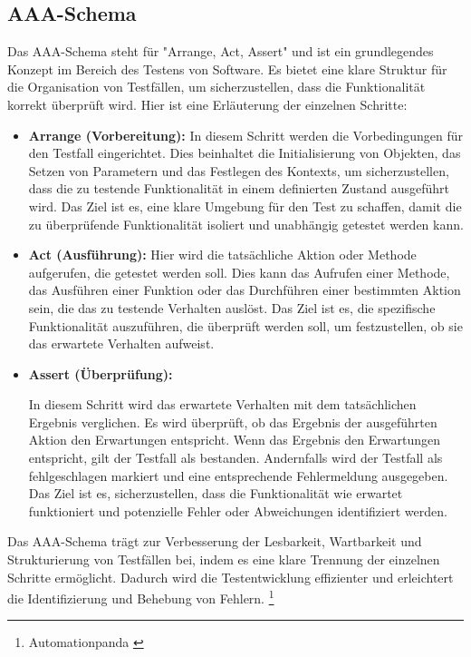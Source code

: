 \begin{itemize}
\subsection{\label{sec:AAA} AAA-Schema}
Das AAA-Schema steht für "Arrange, Act, Assert" und ist ein grundlegendes Konzept im Bereich des Testens von Software. Es bietet eine klare Struktur für die Organisation von Testfällen, um sicherzustellen, dass die Funktionalität korrekt überprüft wird. Hier ist eine Erläuterung der einzelnen Schritte:
\begin{itemize}
\item \textbf{Arrange (Vorbereitung):} In diesem Schritt werden die Vorbedingungen für den Testfall eingerichtet.
Dies beinhaltet die Initialisierung von Objekten, das Setzen von Parametern und das Festlegen des Kontexts, um sicherzustellen, dass die zu testende Funktionalität in einem definierten Zustand ausgeführt wird.
Das Ziel ist es, eine klare Umgebung für den Test zu schaffen, damit die zu überprüfende Funktionalität isoliert und unabhängig getestet werden kann.
\item \textbf{Act (Ausführung):}
Hier wird die tatsächliche Aktion oder Methode aufgerufen, die getestet werden soll.
Dies kann das Aufrufen einer Methode, das Ausführen einer Funktion oder das Durchführen einer bestimmten Aktion sein, die das zu testende Verhalten auslöst.
Das Ziel ist es, die spezifische Funktionalität auszuführen, die überprüft werden soll, um festzustellen, ob sie das erwartete Verhalten aufweist.
\item \textbf{Assert (Überprüfung):}

In diesem Schritt wird das erwartete Verhalten mit dem tatsächlichen Ergebnis verglichen.
Es wird überprüft, ob das Ergebnis der ausgeführten Aktion den Erwartungen entspricht.
Wenn das Ergebnis den Erwartungen entspricht, gilt der Testfall als bestanden. Andernfalls wird der Testfall als fehlgeschlagen markiert und eine entsprechende Fehlermeldung ausgegeben.
Das Ziel ist es, sicherzustellen, dass die Funktionalität wie erwartet funktioniert und potenzielle Fehler oder Abweichungen identifiziert werden.
\end{itemize}

Das AAA-Schema trägt zur Verbesserung der Lesbarkeit, Wartbarkeit und Strukturierung von Testfällen bei, indem es eine klare Trennung der einzelnen Schritte ermöglicht. Dadurch wird die Testentwicklung effizienter und erleichtert die Identifizierung und Behebung von
Fehlern. \footnote{Automationpanda \cite{Arrange Act Assert}}


\end{itemize}
